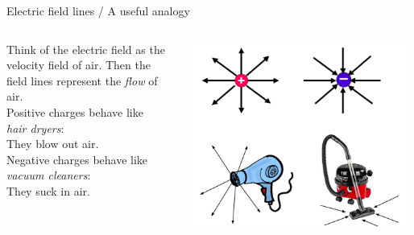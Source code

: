 \begin{frame}{Electric field lines / A useful analogy}

\begin{columns}
  \begin{column}{0.30\textwidth}
   \begin{center}
     Think of the electric field as the velocity field of air.
     Then the field lines represent the {\em flow} of air.\\
     \vspace{0.5cm}
     Positive charges behave like\\ {\em hair dryers}:\\
     They blow out air.\\
     \vspace{0.3cm}
     Negative charges behave like\\ {\em vacuum cleaners}: \\
     They suck in air.
   \end{center}
  \end{column}
  \begin{column}{0.70\textwidth}
   \begin{center}
    \includegraphics[width=0.98\textwidth]{./images/schematics/electric_field_lines_analogy.png}\\
   \end{center}
  \end{column}
\end{columns}

\end{frame}


